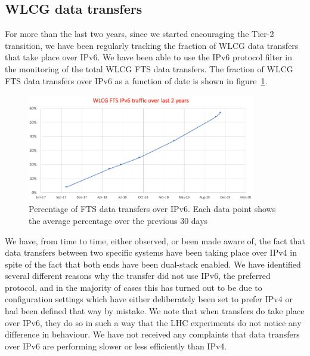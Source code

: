 
\subsection{WLCG data transfers}

For more than the last two years, since we started encouraging the Tier-2 transition, we have been regularly tracking the fraction of WLCG data transfers that take place over IPv6. We have been able to use the IPv6 protocol filter in the monitoring of the total WLCG FTS data transfers.
The fraction of WLCG FTS data transfers over IPv6 as a function of date is shown in  figure~\ref{fig:FTS}.
\begin{figure}[h]
\centering
\includegraphics[width=10cm]{FTS}
\caption{Percentage of FTS data transfers over IPv6. Each data point shows the average percentage over the previous 30 days}
\label{fig:FTS}
\end{figure}

We have, from time to time, either observed, or been made aware of, the fact that data transfers between two specific systems have been taking place over IPv4 in spite of the fact that both ends have been dual-stack enabled. We have identified several different reasons why the transfer did not use IPv6, the preferred protocol, and in the majority of cases this has turned out to be due to configuration settings which have either deliberately been set to prefer IPv4 or had been defined that way by mistake. We note that when transfers do take place over IPv6, they do so in such a way that the LHC experiments do not notice any difference in behaviour. We have not received any complaints that data transfers over IPv6 are performing slower or less efficiently than IPv4.